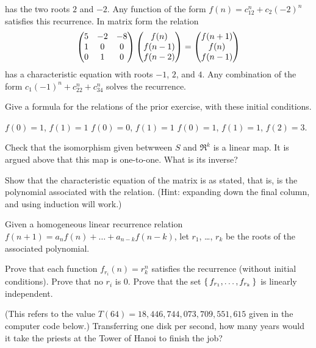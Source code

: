 \begin{exercises}
\begin{answer}
\begin{exparts}
        has the two roots $2$ and $-2$.
        Any function of the form
        $f(n)=c_12^n+c_2(-2)^n$
        satisfies this recurrence.
      \partsitem 
        In matrix form the relation
        \begin{equation*}
          \begin{pmatrix}
            5  &-2  &-8  \\
            1  &0  &0  \\
            0  &1  &0
          \end{pmatrix}
          \begin{pmatrix} f(n) \\ f(n-1) \\ f(n-2) \end{pmatrix}
          =
          \begin{pmatrix} f(n+1) \\ f(n) \\ f(n-1) \end{pmatrix}
        \end{equation*}
        has a characteristic equation with roots $-1$, $2$, and $4$.
        Any combination of the form
        $c_1(-1)^n+c_22^n+c_34^n$ solves the recurrence.
    \end{exparts} 
   \end{answer}
  \item \label{exer:SolvePartRecurSoltn} 
    Give a formula for the relations of the prior exercise, with
    these initial conditions.
    \begin{exparts}
      \partsitem $f(0)=1$, $f(1)=1$
      \partsitem $f(0)=0$, $f(1)=1$
      \partsitem $f(0)=1$, $f(1)=1$, $f(2)=3$.      
    \end{exparts}
  \item \label{exer:SeqToRnLinMap}
    Check that the isomorphism given betwween $S$ and $\Re^k$ is a linear map. 
    It is argued above that this map is one-to-one.
    What is its inverse?
  \item \label{exer:CharEqnIsDeter}
    Show that the characteristic equation of the matrix is as stated, that is,
    is the polynomial associated with the relation.
    (Hint: expanding down the final column, and using induction will work.)  
  \item \label{exer:SoltnsLinRecur}
    Given a homogeneous linear recurrence relation
    $f(n+1)=a_nf(n)+\dots+a_{n-k}f(n-k)$, let $r_1$, \ldots, $r_k$ be the
    roots of the associated polynomial.
    \begin{exparts}
      \partsitem Prove that each function 
         $f_{r_i}(n)=r_k^n$
         satisfies the recurrence (without initial conditions).
      \partsitem Prove that no $r_i$ is $0$.
      \partsitem Prove that the set 
        $\mbox{$\{\,f_{r_1},\dots,f_{r_k}\,\}$}$
        is linearly independent.
    \end{exparts}
  \item 
    (This refers to the value $T(64)=18,446,744,073,709,551,615$
    given in the computer code below.)
    Transferring one disk per second, how many years would it take
    the priests at the Tower of Hanoi to finish the job?
\end{exercises}

